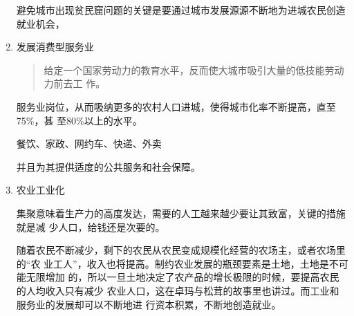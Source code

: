 \begin{enumerate}
  避免城市出现贫民窟问题的关键是要通过城市发展源源不断地为进城农民创造就业机会，

\item 发展消费型服务业

  \begin{quotation}
    给定一个国家劳动力的教育水平，反而使大城市吸引大量的低技能劳动力前去工
    作。
  \end{quotation}


  服务业岗位，从而吸纳更多的农村人口进城，使得城市化率不断提高，直至75\%，甚
  至80\%以上的水平。

  餐饮、家政、网约车、快递、外卖


  并且为其提供适度的公共服务和社会保障。


\item 农业工业化

  集聚意味着生产力的高度发达，需要的人工越来越少要让其致富，关键的措施就是减
  少人口，给钱还是次要的。

  随着农民不断减少，剩下的农民从农民变成规模化经营的农场主，或者农场里的“农
  业工人”，收入也将提高。制约农业发展的瓶颈要素是土地，土地是不可能无限增加
  的，所以一旦土地决定了农产品的增长极限的时候，要提高农民的人均收入只有减少
  农业人口，这在卓玛与松茸的故事里也讲过。而工业和服务业的发展却可以不断地进
  行资本积累，不断地创造就业。
\end{enumerate}












